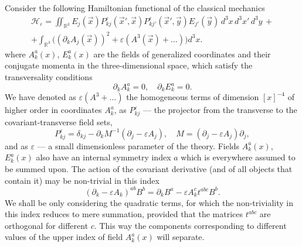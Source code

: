 \documentclass[12pt]{article}
\newcommand{\pl}{\partial}
\newcommand{\Hcl}{\mathcal{H}}
\newcommand{\RR}{\mathbb{R}}
\newcommand{\ve}{\varepsilon}
\begin{document}
	Consider the following Hamiltonian functional of the classical
    mechanics
\begin{multline}
\label{qH3}
    \Hcl_{\ve}
    = \iint_{\RR^{3}} E_{j}(\vec{x}) P_{kj}^{\ve}(\vec{x}',\vec{x})
	P_{kj'}^{\ve}(\vec{x}',\vec{y}) E_{j'}(\vec{y})
	    \, d^{3}x \, d^{3}x' \, d^{3}y \,+\\
	+ \int_{\RR^{3}}\bigl((\pl_{k} A_{j}(\vec{x}))^{2}
	+ \ve (A^{3}(\vec{x})+\ldots) \bigr) d^{3}x .
\end{multline}
    where
$ A_{k}^{a}(x) $,
$ E_{k}^{a}(x) $ are the fields of generalized coordinates and their
    conjugate momenta in the three-dimensional space, which satisfy
    the transversality conditions
\begin{equation}
\label{transAE}
    \pl_{k} A_{k}^{a} = 0, \quad 
    \pl_{k} E_{k}^{a} = 0 .
\end{equation}
	We have denoted as 
$ \ve (A^{3}+\ldots) $
	the homogeneous terms of dimension
$ [x]^{-4} $
	of higher order in coordinates
$ A_{k}^{a} $,
	as
$ P_{kj}^{\ve} $ --- the projector from the transverse
	to the covariant-transverse field sets,
\begin{equation*}
    P_{kj}^{\ve}
	= \delta_{kj} - \pl_{k} M^{-1} (\pl_{j}-\ve A_{j}),
	\quad M = (\pl_{j} - \ve A_{j}) \pl_{j} ,
\end{equation*}
    and as
$ \ve $ --- a small dimensionless parameter of the theory.
	Fields
$ A_{k}^{a}(x) $,
$ E_{k}^{a}(x) $
	also have an internal symmetry index
$ a $
	which is everywhere assumed to be summed upon.
	The action of the covariant derivative (and of all objects that contain it)
	may be non-trivial in this index
\begin{equation*}
    (\pl_{k}-\ve A_{k})^{ab} B^{b} = \pl_{k} B^{a}
	- \ve A_{k}^{c} t^{abc} B^{b} .
\end{equation*}
	We shall be only considering the quadratic terms, for which the
    non-triviality in this index reduces to mere summation,
	provided that the matrices 
$ t^{abc} $
	are orthogonal for different
$ c $.
    This way the components corresponding to different values of the upper
    index of field
$ A_{k}^{a}(x) $
    will separate.
\end{document}
